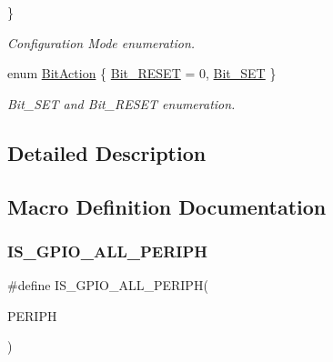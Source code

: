 \begin{DoxyCompactItemize}
 \}\begin{DoxyCompactList}\small\item\em Configuration Mode enumeration. \end{DoxyCompactList}
\item 
enum \hyperlink{group___g_p_i_o___exported___types_ga176130b21c0e719121470a6042d4cf19}{Bit\+Action} \{ \hyperlink{group___g_p_i_o___exported___types_gga176130b21c0e719121470a6042d4cf19ae2c026f2b44a949f82a65f3385edef09}{Bit\+\_\+\+R\+E\+S\+ET} = 0, 
\hyperlink{group___g_p_i_o___exported___types_gga176130b21c0e719121470a6042d4cf19a3c477841a6ceec13fe47ef322432b992}{Bit\+\_\+\+S\+ET}
 \}\begin{DoxyCompactList}\small\item\em Bit\+\_\+\+S\+ET and Bit\+\_\+\+R\+E\+S\+ET enumeration. \end{DoxyCompactList}
\end{DoxyCompactItemize}


\subsection{Detailed Description}


\subsection{Macro Definition Documentation}
\mbox{\label{group___g_p_i_o___exported___types_ga68b2a1f0b05c13978217db5439c7f790}} 
\subsubsection{\texorpdfstring{I\+S\+\_\+\+G\+P\+I\+O\+\_\+\+A\+L\+L\+\_\+\+P\+E\+R\+I\+PH}{IS\_GPIO\_ALL\_PERIPH}}
{\footnotesize\ttfamily \#define I\+S\+\_\+\+G\+P\+I\+O\+\_\+\+A\+L\+L\+\_\+\+P\+E\+R\+I\+PH(\begin{DoxyParamCaption}\item[{}]{P\+E\+R\+I\+PH }\end{DoxyParamCaption})}

